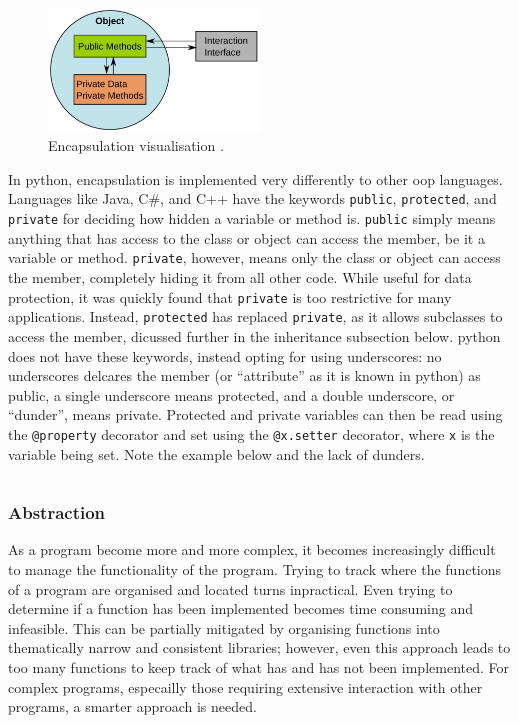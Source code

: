 \documentclass[11pt]{article}
\begin{document}
\begin{figure}[b!]
    \centering
    \includegraphics[width=0.5\textwidth]{figures/encapsulation.jpg}
    \caption{Encapsulation visualisation \cite{oop-encapsulation}.}
    \label{fig:encapsulation}
\end{figure}

In \Gls{python}, encapsulation is implemented very differently to other \acrshort{oop} languages. Languages like Java, C\#, and C++ have the keywords \texttt{public}, \texttt{protected}, and \texttt{private} for deciding how hidden a variable or method is. \texttt{public} simply means anything that has access to the \gls{class} or \gls{object} can access the member, be it a variable or method. \texttt{private}, however, means only the \gls{class} or \gls{object} can access the member, completely hiding it from all other code. While useful for data protection, it was quickly found that \texttt{private} is too restrictive for many applications. Instead, \texttt{protected} has replaced \texttt{private}, as it allows subclasses to access the member, dicussed further in the inheritance subsection below. \Gls{python} does not have these keywords, instead opting for using underscores: no underscores delcares the member (or ``attribute'' as it is known in \Gls{python}) as public, a single underscore means protected, and a double underscore, or ``\gls{dunder}'', means private. Protected and private variables can then be read using the \texttt{@property} decorator and set using the \texttt{@x.setter} decorator, where \texttt{x} is the variable being set. Note the example below and the lack of \glspl{dunder}.

\inputminted[linenos=true]{python}{python_examples/encapsulation.py}

\subsubsection{Abstraction}

As a program become more and more complex, it becomes increasingly difficult to manage the functionality of the program. Trying to track where the functions of a program are organised and located turns inpractical. Even trying to determine if a function has been implemented becomes time consuming and infeasible. This can be partially mitigated by organising functions into thematically narrow and consistent libraries; however, even this approach leads to too many functions to keep track of what has and has not been implemented. For complex programs, especailly those requiring extensive interaction with other programs, a smarter approach is needed.
\end{document}
